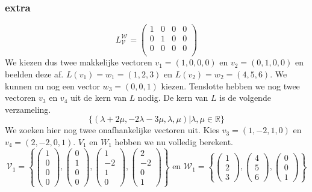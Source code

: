 \documentclass[lineaire_algebra_oplossingen.tex]{subfiles}
\begin{document}
\subsubsection*{extra}
\[
L_\mathcal{V}^\mathcal{W} = 
\begin{pmatrix}
1 & 0 & 0 & 0\\
0 & 1 & 0 & 0\\
0 & 0 & 0 & 0\\
\end{pmatrix}
\]
We kiezen dus twee makkelijke vectoren $v_1 = (1,0,0,0)$ en $v_2 = (0,1,0,0)$ en beelden deze af. $L(v_1) = w_1 = (1,2,3)$ en $L(v_2) = w_2 = (4,5,6)$. We kunnen nu nog een vector $w_3 = (0,0,1)$ kiezen. Tenslotte hebben we nog twee vectoren $v_3$ en $v_4$ uit de kern van $L$ nodig.
De kern van $L$ is de volgende verzameling.
\[
\{
(\lambda + 2\mu, -2\lambda -3\mu, \lambda, \mu) | \lambda,\mu \in \mathbb{R}
\}
\]
We zoeken hier nog twee onafhankelijke vectoren uit. Kies $v_3 = (1,-2,1,0)$ en $v_4 = (2,-2,0,1)$.
$V_1$ en $W_1$ hebben we nu volledig berekent.
\[
\mathcal{V}_1 = 
\left\{
\begin{pmatrix}
1\\0\\0\\0
\end{pmatrix}
,
\begin{pmatrix}
0\\1\\0\\0
\end{pmatrix}
,
\begin{pmatrix}
1\\-2\\1\\0
\end{pmatrix}
,
\begin{pmatrix}
2\\-2\\0\\1
\end{pmatrix}
\right\}
\text{ en }
\mathcal{W}_1 = 
\left\{
\begin{pmatrix}
1\\2\\3
\end{pmatrix}
,
\begin{pmatrix}
4\\5\\6
\end{pmatrix}
,
\begin{pmatrix}
0\\0\\1
\end{pmatrix}
\right\}
\]
\end{document}
